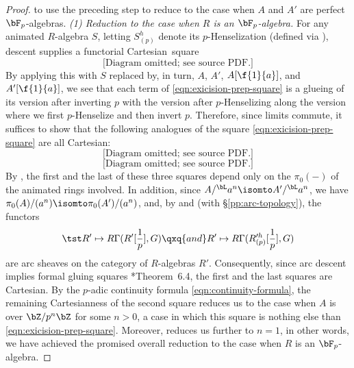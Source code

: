 \begin{proof}
\item
to use the preceding step to reduce to the case when $A$ and $A'$ are perfect $\bF_p$-algebras.
\eenum
\emph{(1) Reduction to the case when $R$ is an $\bF_p$-algebra.} For any animated $R$-algebra $S$, letting  $S_{(p)}^h$ denote its $p$-Henselization (defined via ), descent supplies a functorial Cartesian~square
\[\text{[Diagram omitted; see source PDF.]}\]
By applying this with $S$ replaced by, in turn, $A$, $A'$, $A[\f{1}{a}]$, and $A'[\f{1}{a}]$, we see that each term of \eqref{eqn:exicision-prep-square} is a glueing of its version after inverting $p$ with the version after $p$-Henselizing along the version where we first $p$-Henselize and then invert $p$. Therefore, since limits commute, it suffices to show that the following analogues of the square \eqref{eqn:exicision-prep-square} are all Cartesian:
\[\text{[Diagram omitted; see source PDF.]}\]
\[\text{[Diagram omitted; see source PDF.]}\]
By , the first and the last of these three squares depend only on the $\pi_0(-)$ of the animated rings involved. In addition, since $A/^\bL a^n \isomto A'/^\bL a^n$, we have $\pi_0(A)/(a^n) \isomto \pi_0(A')/(a^n)$, and, by  and  (with \S\ref{pp:arc-topology}),  the functors
\[
\tst R'\mapsto R\Gamma(R'[\frac 1p],G) \qxq{and} R'\mapsto R\Gamma(R'^h_{(p)}[\frac 1p],G)
\]
are arc sheaves on the category of $R$-algebras $R'$. Consequently, since arc descent implies formal gluing squares \cite{BM20}*{Theorem~6.4}, %
the first and the last squares are Cartesian.
By the $p$-adic continuity formula \eqref{eqn:continuity-formula}, the remaining Cartesianness of the second square reduces us to the case when $A$ is over $\bZ/p^n\bZ$ for some $n > 0$, a case in which this square is nothing else than \eqref{eqn:exicision-prep-square}. Moreover,   reduces us further to $n = 1$, in other words, we have achieved the promised overall reduction to the case when $R$ is an $\bF_p$-algebra.



\end{proof}
